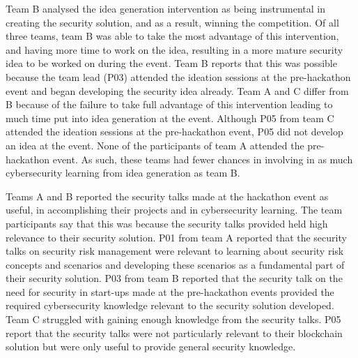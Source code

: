 \documentclass[runningheads]{llncs}
\begin{document}
Team B analysed the idea generation intervention as being instrumental in creating the security solution, and as a result, winning the competition. Of all three teams, team B was able to take the most advantage of this intervention, and having more time to work on the idea, resulting in a more mature security idea to be worked on during the event. Team B reports that this was possible because the team lead (P03) attended the ideation sessions at the pre-hackathon event and began developing the security idea already.
Team A and C differ from B because of the failure to take full advantage of this intervention leading to much time put into idea generation at the event. Although P05 from team C attended the ideation sessions at the pre-hackathon event, P05 did not develop an idea at the event. None of the participants of team A attended the pre-hackathon event.
As such, these teams had fewer chances in involving in as much cybersecurity learning from idea generation as team B.


Teams A and B reported the security talks made at the hackathon event as useful, in accomplishing their projects and in cybersecurity learning. The team participants say that this was because the security talks provided held high relevance to their security solution. 
P01 from team A reported that the security talks on security risk management were relevant to learning about security risk concepts and scenarios and developing these scenarios as a fundamental part of their security solution. P03 from team B reported that the security talk on the need for security in start-ups made at the pre-hackathon events provided the required cybersecurity knowledge relevant to the security solution developed.
Team C struggled with gaining enough knowledge from the security talks. P05 report that the security talks were not particularly relevant to their blockchain solution but were only useful to provide general security knowledge.
\end{document}

